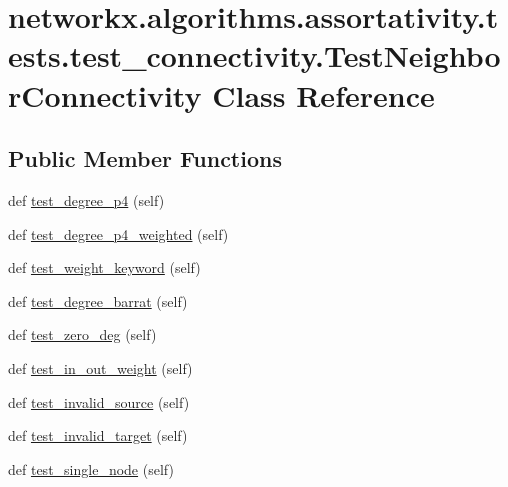 \hypertarget{classnetworkx_1_1algorithms_1_1assortativity_1_1tests_1_1test__connectivity_1_1TestNeighborConnectivity}{}\section{networkx.\+algorithms.\+assortativity.\+tests.\+test\+\_\+connectivity.\+Test\+Neighbor\+Connectivity Class Reference}
\label{classnetworkx_1_1algorithms_1_1assortativity_1_1tests_1_1test__connectivity_1_1TestNeighborConnectivity}
\subsection*{Public Member Functions}
\begin{DoxyCompactItemize}
\item 
def \hyperlink{classnetworkx_1_1algorithms_1_1assortativity_1_1tests_1_1test__connectivity_1_1TestNeighborConnectivity_a66dce4dde97596c133fad9fa52692b5e}{test\+\_\+degree\+\_\+p4} (self)
\item 
def \hyperlink{classnetworkx_1_1algorithms_1_1assortativity_1_1tests_1_1test__connectivity_1_1TestNeighborConnectivity_afdf8d07298a734945b449a4ba5590a0e}{test\+\_\+degree\+\_\+p4\+\_\+weighted} (self)
\item 
def \hyperlink{classnetworkx_1_1algorithms_1_1assortativity_1_1tests_1_1test__connectivity_1_1TestNeighborConnectivity_a3c31e27e0a9a1fc9a36d165d0c3ee450}{test\+\_\+weight\+\_\+keyword} (self)
\item 
def \hyperlink{classnetworkx_1_1algorithms_1_1assortativity_1_1tests_1_1test__connectivity_1_1TestNeighborConnectivity_aefdb94a1ff652422ada56b70732c98c0}{test\+\_\+degree\+\_\+barrat} (self)
\item 
def \hyperlink{classnetworkx_1_1algorithms_1_1assortativity_1_1tests_1_1test__connectivity_1_1TestNeighborConnectivity_a9a625edb314e2c90253974c6a8f771fb}{test\+\_\+zero\+\_\+deg} (self)
\item 
def \hyperlink{classnetworkx_1_1algorithms_1_1assortativity_1_1tests_1_1test__connectivity_1_1TestNeighborConnectivity_a41882a44e2327f05e93521d4f4c710c0}{test\+\_\+in\+\_\+out\+\_\+weight} (self)
\item 
def \hyperlink{classnetworkx_1_1algorithms_1_1assortativity_1_1tests_1_1test__connectivity_1_1TestNeighborConnectivity_ae774c923df17b3b82e0d84e4dbe394aa}{test\+\_\+invalid\+\_\+source} (self)
\item 
def \hyperlink{classnetworkx_1_1algorithms_1_1assortativity_1_1tests_1_1test__connectivity_1_1TestNeighborConnectivity_a57cfa4e3e73583941ca25fb0b95cffac}{test\+\_\+invalid\+\_\+target} (self)
\item 
def \hyperlink{classnetworkx_1_1algorithms_1_1assortativity_1_1tests_1_1test__connectivity_1_1TestNeighborConnectivity_a17253cb919b3ee93387bafeccf21d511}{test\+\_\+single\+\_\+node} (self)
\end{DoxyCompactItemize}


